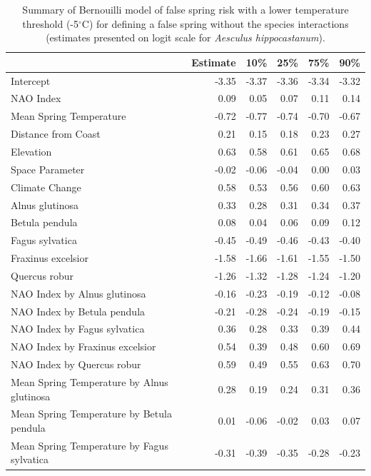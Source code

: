 \documentclass{article}\usepackage[]{graphicx}\usepackage[]{color}
\begin{document}
\begin{longtable}{lrrrrr}
\caption{Summary of Bernouilli model of false spring risk with a lower temperature threshold (-5$^{\circ}$C) for defining a false spring without the species interactions (estimates presented on logit scale for \textit{Aesculus hippocastanum}).} \\ 
  \hline
 & Estimate & 10\% & 25\% & 75\% & 90\% \\ 
  \hline \endhead  \hline
Intercept & -3.35 & -3.37 & -3.36 & -3.34 & -3.32 \\ 
  NAO Index & 0.09 & 0.05 & 0.07 & 0.11 & 0.14 \\ 
  Mean Spring 
Temperature & -0.72 & -0.77 & -0.74 & -0.70 & -0.67 \\ 
  Distance from 
Coast & 0.21 & 0.15 & 0.18 & 0.23 & 0.27 \\ 
  Elevation & 0.63 & 0.58 & 0.61 & 0.65 & 0.68 \\ 
  Space Parameter & -0.02 & -0.06 & -0.04 & 0.00 & 0.03 \\ 
  Climate Change & 0.58 & 0.53 & 0.56 & 0.60 & 0.63 \\ 
  Alnus glutinosa & 0.33 & 0.28 & 0.31 & 0.34 & 0.37 \\ 
  Betula pendula & 0.08 & 0.04 & 0.06 & 0.09 & 0.12 \\ 
  Fagus sylvatica & -0.45 & -0.49 & -0.46 & -0.43 & -0.40 \\ 
  Fraxinus excelsior & -1.58 & -1.66 & -1.61 & -1.55 & -1.50 \\ 
  Quercus robur & -1.26 & -1.32 & -1.28 & -1.24 & -1.20 \\ 
  NAO Index
by Alnus glutinosa & -0.16 & -0.23 & -0.19 & -0.12 & -0.08 \\ 
  NAO Index
by Betula pendula & -0.21 & -0.28 & -0.24 & -0.19 & -0.15 \\ 
  NAO Index
by Fagus sylvatica & 0.36 & 0.28 & 0.33 & 0.39 & 0.44 \\ 
  NAO Index
by Fraxinus excelsior & 0.54 & 0.39 & 0.48 & 0.60 & 0.69 \\ 
  NAO Index
by Quercus robur & 0.59 & 0.49 & 0.55 & 0.63 & 0.70 \\ 
  Mean Spring 
Temperature
by Alnus glutinosa & 0.28 & 0.19 & 0.24 & 0.31 & 0.36 \\ 
  Mean Spring 
Temperature
by Betula pendula & 0.01 & -0.06 & -0.02 & 0.03 & 0.07 \\ 
  Mean Spring 
Temperature
by Fagus sylvatica & -0.31 & -0.39 & -0.35 & -0.28 & -0.23 \\ 

\end{longtable}
\end{document}
